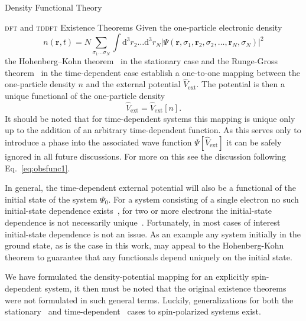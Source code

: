 \documentclass[letterpaper, 11 pt]{report}
\begin{document}
\begin{chapter}{Density Functional Theory \label{chap:dft}}
\begin{section}{\textsc{dft} and \textsc{tddft} Existence Theorems \label{sec:dft}}
      Given the one-particle electronic density
      \begin{equation} \label{eq:dendef1}
         n(\mathbf{r}, t) = N \sum\limits_{\sigma_1 \dots \sigma_N} \int \mathrm{d}^3 r_2 \dots
                              \mathrm{d}^3 r_N \left| \Psi(\mathbf{r}, \sigma_1, \mathbf{r}_2,
                              \sigma_2, \dots, \mathbf{r}_N, \sigma_N) \right|^2
      \end{equation}
      the Hohenberg–Kohn theorem~\cite{hk-theorem} in the stationary case and the Runge-Gross
      theorem~\cite{rgt} in the time-dependent case establish a one-to-one mapping between the
      one-particle density $n$ and the external potential $\hat{V}_\mathrm{ext}$. The potential is
      then a unique functional of the one-particle density
      \begin{equation} \label{eq:vext-func}
         \hat{V}_\mathrm{ext} = \hat{V}_\mathrm{ext} [n].
      \end{equation}
      It should be noted that for time-dependent systems this mapping is unique only up to the addition
      of an arbitrary time-dependent function. As this serves only to introduce a phase into the
      associated wave function $\Psi[\hat{V}_\mathrm{ext}]$ it can be safely ignored in all future
      discussions. For more on this see the discussion following Eq.~\eqref{eq:obsfunc1}.

      In general, the time-dependent external potential will also be a functional of the initial state
      of the system $\Psi_0$. For a system consisting of a single electron no such initial-state
      dependence exists~\cite{initial1, initial1-erratum}, for two or more electrons the initial-state
      dependence is not necessarily unique~\cite{initial2, initial2-re, initial2-rere, initial3}.
      Fortunately, in most cases of interest initial-state dependence is not an issue. As an example
      any system initially in the ground state, as is the case in this work, may appeal to the
      Hohenberg-Kohn theorem to guarantee that any functionals depend uniquely on the initial state.

      We have formulated the density-potential mapping for an explicitly spin-dependent system, it
      then must be noted that the original existence theorems were not formulated in such general terms.
      Luckily, generalizations for both the stationary~\cite{spin-dep1, spin-dep2} and
      time-dependent~\cite{td-spindep} cases to spin-polarized systems exist.


\end{section}
\end{chapter}
\end{document}
